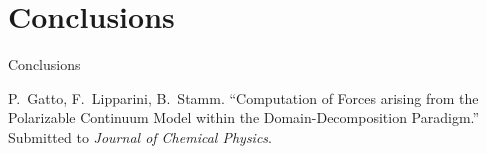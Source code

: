 \section{{\bf Conclusions}}


\begin{frame}{Conclusions}

\begin{mybox}
\begin{wideitemize}
\item 
\end{wideitemize}
\end{mybox}


\vfill

{\footnotesize
{P.~Gatto}, F.~Lipparini, B.~Stamm. ``Computation of Forces arising from the Polarizable Continuum Model within the Domain-Decomposition Paradigm.'' Submitted to \textit{Journal of Chemical Physics}.
}
\end{frame}

%
%
%
%
%
%


%
%
%
%
%





